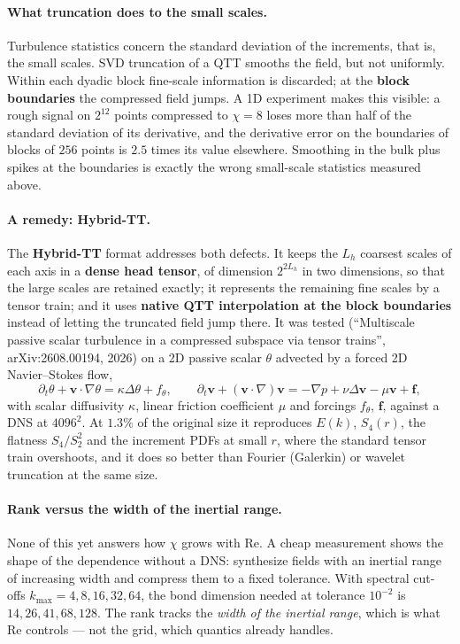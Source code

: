 \paragraph{What truncation does to the small scales.}
Turbulence statistics concern the standard deviation of the increments, that is,
the small scales. SVD truncation of a QTT smooths the field, but not uniformly.
Within each dyadic block fine-scale information is discarded; at the
\textbf{block boundaries} the compressed field jumps. A 1D experiment makes this
visible: a rough signal on $2^{12}$ points compressed to $\chi = 8$ loses more
than half of the standard deviation of its derivative, and the derivative error
on the boundaries of blocks of $256$ points is $2.5$ times its value elsewhere.
Smoothing in the bulk plus spikes at the boundaries is exactly the wrong
small-scale statistics measured above.

\paragraph{A remedy: Hybrid-TT.}
The \textbf{Hybrid-TT} format addresses both defects. It keeps the $L_h$
coarsest scales of each axis in a \textbf{dense head tensor}, of dimension
$2^{2L_h}$ in two dimensions, so that the large scales are retained exactly; it
represents the remaining fine scales by a tensor train; and it uses
\textbf{native QTT interpolation at the block boundaries} instead of letting the
truncated field jump there. It was tested (\enquote{Multiscale passive scalar
turbulence in a compressed subspace via tensor trains}, arXiv:2608.00194, 2026)
on a 2D passive scalar $\theta$ advected by a forced 2D Navier--Stokes flow,
\begin{equation}
  \partial_t\theta + \mathbf{v}\cdot\nabla\theta = \kappa\Delta\theta + f_\theta,
  \qquad
  \partial_t\mathbf{v} + (\mathbf{v}\cdot\nabla)\mathbf{v}
    = -\nabla p + \nu\Delta\mathbf{v} - \mu\mathbf{v} + \mathbf{f},
\end{equation}
with scalar diffusivity $\kappa$, linear friction coefficient $\mu$ and forcings
$f_\theta$, $\mathbf{f}$, against a DNS at $4096^2$. At $1.3\%$ of the original
size it reproduces $E(k)$, $S_4(r)$, the flatness $S_4/S_2^2$ and the increment
PDFs at small $r$, where the standard tensor train overshoots, and it does so
better than Fourier (Galerkin) or wavelet truncation at the same size.

\paragraph{Rank versus the width of the inertial range.}
None of this yet answers how $\chi$ grows with $\mathrm{Re}$. A cheap
measurement shows the shape of the dependence without a DNS: synthesize fields
with an inertial range of increasing width and compress them to a fixed
tolerance. With spectral cut-offs $k_{\max} = 4, 8, 16, 32, 64$, the bond
dimension needed at tolerance $10^{-2}$ is $14, 26, 41, 68, 128$. The rank tracks
the \emph{width of the inertial range}, which is what $\mathrm{Re}$ controls ---
not the grid, which quantics already handles.

